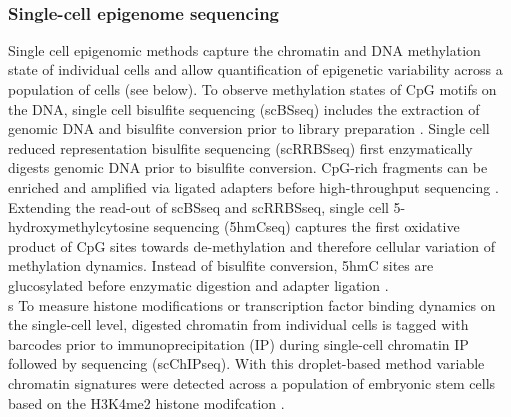 \\



\subsubsection{Single-cell epigenome sequencing}

Single cell epigenomic methods capture the chromatin and DNA methylation state of individual cells and allow quantification of epigenetic variability across a population of cells (see below)\citep{Clark2016}. To observe methylation states of CpG motifs on the DNA, single cell bisulfite sequencing (scBSseq) includes the extraction of genomic DNA and bisulfite conversion prior to library preparation \citep{Smallwood2014, Farlik2015}. Single cell reduced representation bisulfite sequencing (scRRBSseq) first enzymatically digests genomic DNA prior to bisulfite conversion. CpG-rich fragments can be enriched and amplified via ligated adapters before high-throughput sequencing \citep{Guo2013}. Extending the read-out of scBSseq and scRRBSseq, single cell 5-hydroxymethylcytosine sequencing (5hmCseq) captures the first oxidative product of CpG sites towards de-methylation and therefore cellular variation of methylation dynamics. Instead of bisulfite conversion, 5hmC sites are glucosylated before enzymatic digestion and adapter ligation \citep{Mooijman2016}. \\s
To measure histone modifications or transcription factor binding dynamics on the single-cell level, digested chromatin from individual cells is tagged with barcodes prior to immunoprecipitation (IP) during single-cell chromatin IP followed by sequencing (scChIPseq). With this droplet-based method variable chromatin signatures were detected across a population of embryonic stem cells based on the H3K4me2 histone modifcation \citep{Rotem2015}. \\ 
